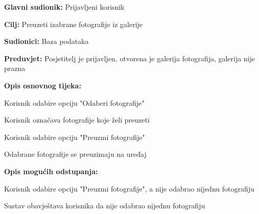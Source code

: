					\noindent {}
					\begin{packed_item}
						
						\item \textbf{Glavni sudionik: } Prijavljeni korisnik
						\item  \textbf{Cilj:} Preuzeti izabrane fotografije iz galerije
						\item  \textbf{Sudionici:} Baza podataka
						\item  \textbf{Preduvjet:} Posjetitelj je prijavljen, otvorena je galerija fotografija, galerija nije prazna
						\item  \textbf{Opis osnovnog tijeka:}
						
						\item[] \begin{packed_enum}
							
							\item Korisnik odabire opciju "Odaberi fotografije"
							\item Korisnik označava fotografije koje želi preuzeti
							\item Korisnik odabire opciju "Preuzmi fotografije"
							\item Odabrane fotografije se preuzimaju na uređaj
							
						\end{packed_enum}
						
						\item  \textbf{Opis mogućih odstupanja:}
						
						\item[] \begin{packed_item}
							
							\item[2.a] Korisnik odabire opciju "Preuzmi fotografije", a nije odabrao nijednu fotografiju
							\item[] \begin{packed_enum}
								
								\item Sustav obavještava korisnika da nije odabrao nijednu fotografiju
								
							\end{packed_enum}
							
						\end{packed_item}
					\end{packed_item}
					
